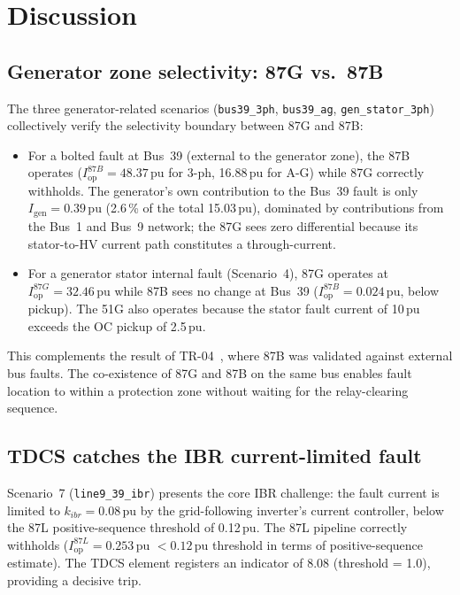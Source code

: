 \documentclass[12pt,a4paper]{article}
\newcommand{\Iop}{I_{\mathrm{op}}}
\begin{document}
\section{Discussion}
\label{sec:discussion}

\subsection{Generator zone selectivity: 87G vs.\ 87B}
\label{sec:gensel}

The three generator-related scenarios (\texttt{bus39\_3ph}, \texttt{bus39\_ag},
\texttt{gen\_stator\_3ph}) collectively verify the selectivity boundary between
87G and 87B:

\begin{itemize}
  \item For a bolted fault at Bus~39 (external to the generator zone),
    the 87B operates ($\Iop^{87B} = 48.37$\,pu for 3-ph, 16.88\,pu for A-G)
    while 87G correctly withholds.  The generator's own contribution to the
    Bus~39 fault is only $I_{\mathrm{gen}} = 0.39$\,pu (2.6\,\% of the total
    15.03\,pu), dominated by contributions from the Bus~1 and Bus~9 network;
    the 87G sees zero differential because its stator-to-HV current path
    constitutes a through-current.
  \item For a generator stator internal fault (Scenario~4), 87G operates
    at $\Iop^{87G} = 32.46$\,pu while 87B sees no change at Bus~39
    ($\Iop^{87B} = 0.024$\,pu, below pickup).  The 51G also operates
    because the stator fault current of 10\,pu exceeds the OC pickup of
    2.5\,pu.
\end{itemize}

This complements the result of TR-04~\citep{SAMBP_TR04}, where 87B was validated
against external bus faults.  The co-existence of 87G and 87B on the same bus
enables fault location to within a protection zone without waiting for the
relay-clearing sequence.

\subsection{TDCS catches the IBR current-limited fault}
\label{sec:ibr}

Scenario~7 (\texttt{line9\_39\_ibr}) presents the core IBR challenge: the fault
current is limited to $k_{ibr} = 0.08$\,pu by the grid-following inverter's
current controller, below the 87L positive-sequence threshold of 0.12\,pu.
The 87L pipeline correctly withholds ($\Iop^{87L} = 0.253$\,pu $< 0.12$\,pu
threshold in terms of positive-sequence estimate).  The TDCS element registers
an indicator of 8.08 (threshold = 1.0), providing a decisive trip.
\end{document}
